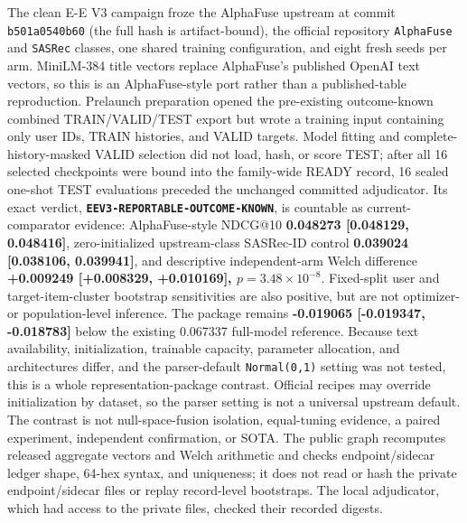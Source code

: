 The clean E-E V3 campaign froze the AlphaFuse upstream at commit \texttt{b501a0540b60} (the full hash is artifact-bound), the official repository \texttt{AlphaFuse} and \texttt{SASRec} classes, one shared training configuration, and eight fresh seeds per arm. MiniLM-384 title vectors replace AlphaFuse's published OpenAI text vectors, so this is an AlphaFuse-style port rather than a published-table reproduction. Prelaunch preparation opened the pre-existing outcome-known combined TRAIN/VALID/TEST export but wrote a training input containing only user IDs, TRAIN histories, and VALID targets. Model fitting and complete-history-masked VALID selection did not load, hash, or score TEST; after all 16 selected checkpoints were bound into the family-wide READY record, 16 sealed one-shot TEST evaluations preceded the unchanged committed adjudicator. Its exact verdict, \textbf{\texttt{EEV3-REPORTABLE-\allowbreak OUTCOME-KNOWN}}, is countable as current-comparator evidence: AlphaFuse-style NDCG@10 \textbf{0.048273 [0.048129, 0.048416]}, zero-initialized upstream-class SASRec-ID control \textbf{0.039024 [0.038106, 0.039941]}, and descriptive independent-arm Welch difference \textbf{+0.009249 [+0.008329, +0.010169], \ensuremath{p=3.48\times10^{-8}}}. Fixed-split user and target-item-cluster bootstrap sensitivities are also positive, but are not optimizer- or population-level inference. The package remains \textbf{-0.019065 [-0.019347, -0.018783]} below the existing 0.067337 full-model reference. Because text availability, initialization, trainable capacity, parameter allocation, and architectures differ, and the parser-default \texttt{Normal(0,1)} setting was not tested, this is a whole representation-package contrast. Official recipes may override initialization by dataset, so the parser setting is not a universal upstream default. The contrast is not null-space-fusion isolation, equal-tuning evidence, a paired experiment, independent confirmation, or SOTA. The public graph recomputes released aggregate vectors and Welch arithmetic and checks endpoint/sidecar ledger shape, 64-hex syntax, and uniqueness; it does not read or hash the private endpoint/sidecar files or replay record-level bootstraps. The local adjudicator, which had access to the private files, checked their recorded digests.

